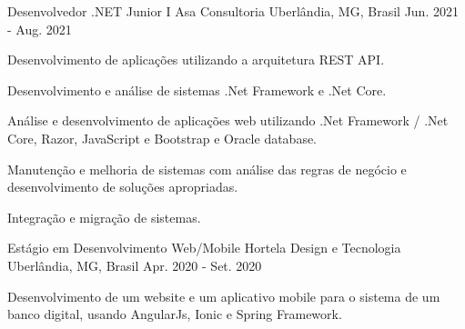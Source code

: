 \begin{cventries}
\cventry
{Desenvolvedor .NET Junior I} %
{Asa Consultoria} %
{Uberlândia, MG, Brasil} %
{Jun. 2021 - Aug. 2021} %
{
  \begin{cvitems} %
    \item {Desenvolvimento de aplicações utilizando a arquitetura REST API.}
    \item {Desenvolvimento e análise de sistemas .Net Framework e .Net Core.}
    \item {Análise e desenvolvimento de aplicações web utilizando .Net Framework / .Net Core, Razor, JavaScript e Bootstrap e Oracle database.}
    \item {Manutenção e melhoria de sistemas com análise das regras de negócio e desenvolvimento de soluções apropriadas.}
    \item {Integração e migração de sistemas.}   
  \end{cvitems}
}

\cventry
{Estágio em Desenvolvimento Web/Mobile} %
{Hortela Design e Tecnologia} %
{Uberlândia, MG, Brasil} %
{Apr. 2020 - Set. 2020} %
{
  \begin{cvitems} %
    \item {Desenvolvimento de um website e um aplicativo mobile para o sistema de um banco digital, usando AngularJs, Ionic e Spring Framework.}
  \end{cvitems}
}

\end{cventries}
